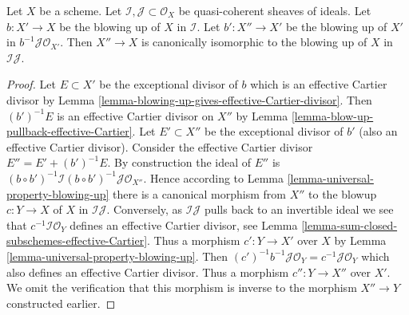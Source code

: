 \begin{lemma}
\label{lemma-blowing-up-two-ideals}
Let $X$ be a scheme. Let $\mathcal{I}, \mathcal{J} \subset \mathcal{O}_X$
be quasi-coherent sheaves of ideals. Let $b : X' \to X$
be the blowing up of $X$ in $\mathcal{I}$. Let $b' : X'' \to X'$ be the
blowing up of $X'$ in $b^{-1}\mathcal{J} \mathcal{O}_{X'}$. Then $X'' \to X$
is canonically isomorphic to the blowing up of $X$ in $\mathcal{I}\mathcal{J}$.
\end{lemma}

\begin{proof}
Let $E \subset X'$ be the exceptional divisor of $b$ which is an effective
Cartier divisor by
Lemma \ref{lemma-blowing-up-gives-effective-Cartier-divisor}.
Then $(b')^{-1}E$ is an effective Cartier divisor on $X''$ by
Lemma \ref{lemma-blow-up-pullback-effective-Cartier}.
Let $E' \subset X''$ be the exceptional divisor of $b'$ (also an effective
Cartier divisor). Consider the effective Cartier divisor
$E'' = E' + (b')^{-1}E$. By construction the ideal of $E''$ is
$(b \circ b')^{-1}\mathcal{I} (b \circ b')^{-1}\mathcal{J} \mathcal{O}_{X''}$.
Hence according to Lemma \ref{lemma-universal-property-blowing-up}
there is a canonical morphism from $X''$ to the blowup $c : Y \to X$
of $X$ in $\mathcal{I}\mathcal{J}$. Conversely, as $\mathcal{I}\mathcal{J}$
pulls back to an invertible ideal we see that
$c^{-1}\mathcal{I}\mathcal{O}_Y$ defines
an effective Cartier divisor, see
Lemma \ref{lemma-sum-closed-subschemes-effective-Cartier}.
Thus a morphism $c' : Y \to X'$ over $X$ by
Lemma \ref{lemma-universal-property-blowing-up}.
Then $(c')^{-1}b^{-1}\mathcal{J}\mathcal{O}_Y = c^{-1}\mathcal{J}\mathcal{O}_Y$
which also defines an effective Cartier divisor. Thus a morphism
$c'' : Y \to X''$ over $X'$. We omit the verification that this
morphism is inverse to the morphism $X'' \to Y$ constructed earlier.
\end{proof}
